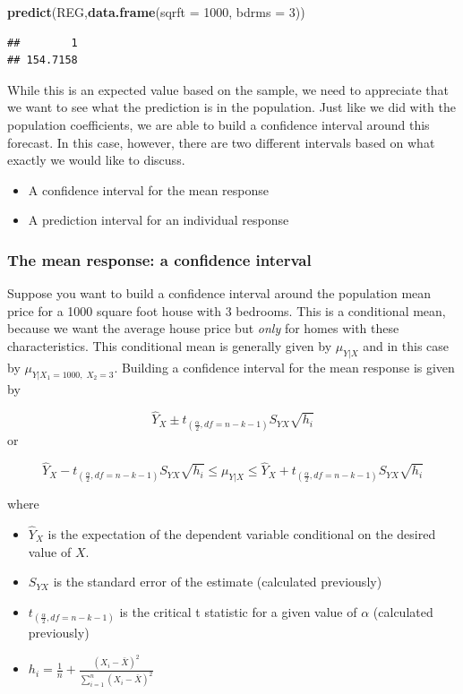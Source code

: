 \documentclass[
]{book}
\newenvironment{Shaded}{\begin{snugshade}}{\end{snugshade}}
\newcommand{\AttributeTok}[1]{\textcolor[rgb]{0.13,0.29,0.53}{#1}}
\newcommand{\DecValTok}[1]{\textcolor[rgb]{0.00,0.00,0.81}{#1}}
\newcommand{\FunctionTok}[1]{\textcolor[rgb]{0.13,0.29,0.53}{\textbf{#1}}}
\newcommand{\NormalTok}[1]{#1}
\begin{document}
\begin{Shaded}
\begin{Highlighting}[]
\FunctionTok{predict}\NormalTok{(REG,}\FunctionTok{data.frame}\NormalTok{(}\AttributeTok{sqrft =} \DecValTok{1000}\NormalTok{, }\AttributeTok{bdrms =} \DecValTok{3}\NormalTok{))}
\end{Highlighting}
\end{Shaded}

\begin{verbatim}
##        1 
## 154.7158
\end{verbatim}

While this is an expected value based on the sample, we need to appreciate that we want to see what the prediction is in the population. Just like we did with the population coefficients, we are able to build a confidence interval around this forecast. In this case, however, there are two different intervals based on what exactly we would like to discuss.

\begin{itemize}
\item
  A confidence interval for the mean response
\item
  A prediction interval for an individual response
\end{itemize}

\subsubsection*{The mean response: a confidence interval}\label{the-mean-response-a-confidence-interval-1}

Suppose you want to build a confidence interval around the population mean price for a 1000 square foot house with 3 bedrooms. This is a conditional mean, because we want the average house price but \emph{only} for homes with these characteristics. This conditional mean is generally given by \(\mu_{Y|X}\) and in this case by \(\mu_{Y|X_1=1000,\;X_2=3}\). Building a confidence interval for the mean response is given by

\[ \hat{Y}_{X} \pm t_{(\frac{\alpha}{2},df=n-k-1)}S_{YX} \sqrt{h_i}\]
or

\[ \hat{Y}_{X} - t_{(\frac{\alpha}{2},df=n-k-1)}S_{YX} \sqrt{h_i} \leq \mu_{Y|X} \leq \hat{Y}_{X} + t_{(\frac{\alpha}{2},df=n-k-1)}S_{YX} \sqrt{h_i}\]

where

\begin{itemize}
\item
  \(\hat{Y}_{X}\) is the expectation of the dependent variable conditional on the desired value of \(X\).
\item
  \(S_{YX}\) is the standard error of the estimate (calculated previously)
\item
  \(t_{(\frac{\alpha}{2},df=n-k-1)}\) is the critical t statistic for a given value of \(\alpha\) (calculated previously)
\item
  \(h_i = \frac{1}{n}+\frac{(X_i - \bar{X})^2}{\sum_{i=1}^n(X_i - \bar{X})^2}\)
\end{itemize}
\end{document}
